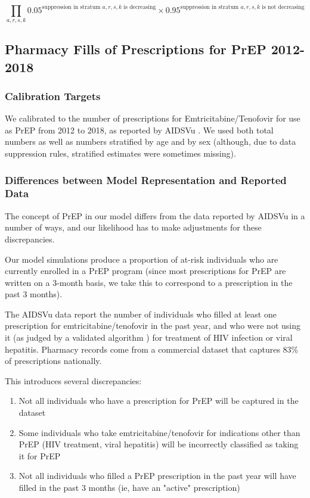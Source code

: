 \documentclass{article}
\begin{document}
\begin{equation}
	\prod_{a,r,s,k} 0.05^{\text{suppression in stratum } a,r,s,k \text{ is decreasing}} \times 0.95^{\text{suppression in stratum } a,r,s,k \text{ is not decreasing}}
\end{equation}




\subsection{Pharmacy Fills of Prescriptions for PrEP 2012-2018}\label{likelihood_prep}

\subsubsection{Calibration Targets}
We calibrated to the number of prescriptions for Emtricitabine/Tenofovir for use as PrEP from 2012 to 2018, as reported by AIDSVu \cite{aidsvu_prep}. We used both total numbers as well as numbers stratified by age and by sex (although, due to data suppression rules, stratified estimates were sometimes missing).

\subsubsection{Differences between Model Representation and Reported Data}
The concept of PrEP in our model differs from the data reported by AIDSVu in a number of ways, and our likelihood has to make adjustments for these discrepancies.

Our model simulations produce a proportion of at-risk individuals who are currently enrolled in a PrEP program (since most prescriptions for PrEP are written on a 3-month basis, we take this to correspond to a prescription in the past 3 months).

The AIDSVu data report the number of individuals who filled at least one prescription for emtricitabine/tenofovir in the past year, and who were not using it (as judged by a validated algorithm \cite{maccannell2015}) for treatment of HIV infection or viral hepatitis. Pharmacy records come from a commercial dataset that captures 83\% of prescriptions nationally. \cite{sullivan2018}

This introduces several discrepancies:
\begin{enumerate}
	\item Not all individuals who have a prescription for PrEP will be captured in the dataset
	\item Some individuals who take emtricitabine/tenofovir for indications other than PrEP (HIV treatment, viral hepatitis) will be incorrectly classified as taking it for PrEP
	\item Not all individuals who filled a PrEP prescription in the past year will have filled in the past 3 months (ie, have an "active" prescription)
\end{enumerate}
\end{document}

